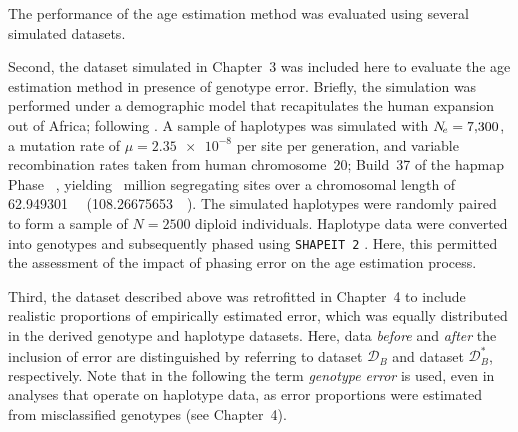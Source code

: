 The performance of the age estimation method was evaluated using several simulated datasets.

Second, the dataset simulated in Chapter~3 was included here to evaluate the age estimation method in presence of genotype error.
Briefly, the simulation was performed under a demographic model that recapitulates the human expansion out of Africa; following \citet{Gutenkunst:2009gs}.
A sample of  haplotypes was simulated with ${N_{\!e} = \num{7300}}$, a mutation rate of ${\mu = \num[round-precision=2]{2.35e-8}}$ per site per generation, and variable recombination rates taken from human chromosome~20; Build~37 of the \gls{hapmap} Phase~ \citep{Frazer:2007kha, InternationalHapMapConsortium:2010en}, yielding ~million segregating sites over a chromosomal length of \SI{62.949301}{\mega\basepair} (\SI{108.26675653}{\centi\morgan}).
The simulated haplotypes were randomly paired to form a sample of ${N = \num{2500}}$ diploid individuals.
Haplotype data were converted into genotypes and subsequently phased using \texttt{SHAPEIT\,2} \citep{Delaneau:2008dk,Delaneau:2013hi}.
Here, this permitted the assessment of the impact of phasing error on the age estimation process.

Third, the dataset described above was retrofitted in Chapter~4 to include realistic proportions of empirically estimated error, which was equally distributed in the derived genotype and haplotype datasets.
Here, data \emph{before} and \emph{after} the inclusion of error are distinguished by referring to dataset $\mathcal{D}_B$ and dataset $\mathcal{D}_B^{\ast}$, respectively.
Note that in the following the term \emph{genotype error} is used, even in analyses that operate on haplotype data, as error proportions were estimated from misclassified genotypes (see Chapter~4).

